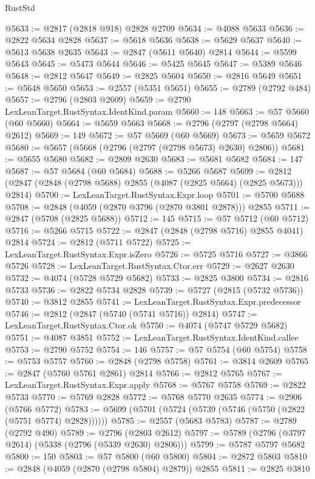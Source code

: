 \begin{lexlean}{RustStd}
\begin{coremodule}
@5633 := @2817 (@2818 @918) @2828 @2709
@5634 := @4088 @5633
@5636 := @2822 @5634 @2828
@5637 := @5618 @5636
@5638 := @5629 @5637
@5640 := @5613 @5638 @2635
@5643 := @2847 (@5611 @5640) @2814
@5644 := @5599 @5643
@5645 := @5473 @5644
@5646 := @5425 @5645
@5647 := @5389 @5646
@5648 := @2812 @5647
@5649 := @2825 @5604
@5650 := @2816 @5649
@5651 := @5648 @5650
@5653 := @2557 (@5351 @5651)
@5655 := @2789 (@2792 @484)
@5657 := @2796 (@2803 @2609)
@5659 := @2790 LexLeanTarget.RustSyntax.IdentKind.param
@5660 := 148
@5663 := @57 @5660 (@60 @5660)
@5664 := @5659 @5663
@5668 := @2796 (@2797 (@2798 @5664) @2612)
@5669 := 149
@5672 := @57 @5669 (@60 @5669)
@5673 := @5659 @5672
@5680 := @5657 (@5668 (@2796 (@2797 (@2798 @5673) @2630) @2806))
@5681 := @5655 @5680
@5682 := @2809 @2630
@5683 := @5681 @5682
@5684 := 147
@5687 := @57 @5684 (@60 @5684)
@5688 := @5266 @5687
@5699 := @2812 (@2847 (@2848 (@2798 @5688) @2855 (@4087 (@2825 @5664) (@2825 @5673))) @2814)
@5700 := LexLeanTarget.RustSyntax.Expr.loop
@5701 := @5700 @5688
@5708 := @2848 (@4059 (@2870 @3796 (@2870 @3801 @2878))) @2855
@5711 := @2847 (@5708 (@2825 @5688))
@5712 := 145
@5715 := @57 @5712 (@60 @5712)
@5716 := @5266 @5715
@5722 := @2847 (@2848 (@2798 @5716) @2855 @4041) @2814
@5724 := @2812 (@5711 @5722)
@5725 := LexLeanTarget.RustSyntax.Expr.isZero
@5726 := @5725 @5716
@5727 := @3866 @5726
@5728 := LexLeanTarget.RustSyntax.Ctor.err
@5729 := @2627 @2630
@5732 := @4074 (@5728 @5729 @5682)
@5733 := @2825 @3800
@5734 := @2816 @5733
@5736 := @2822 @5734 @2828
@5739 := @5727 (@2815 (@5732 @5736))
@5740 := @3812 @2855
@5741 := LexLeanTarget.RustSyntax.Expr.predecessor
@5746 := @2812 (@2847 (@5740 (@5741 @5716)) @2814)
@5747 := LexLeanTarget.RustSyntax.Ctor.ok
@5750 := @4074 (@5747 @5729 @5682)
@5751 := @4087 @3851
@5752 := LexLeanTarget.RustSyntax.IdentKind.callee
@5753 := @2790 @5752
@5754 := 146
@5757 := @57 @5754 (@60 @5754)
@5758 := @5753 @5757
@5760 := @2848 (@2798 @5758)
@5761 := @3814 @2609
@5765 := @2847 (@5760 @5761 @2861) @2814
@5766 := @2812 @5765
@5767 := LexLeanTarget.RustSyntax.Expr.apply
@5768 := @5767 @5758
@5769 := @2822 @5733
@5770 := @5769 @2828
@5772 := @5768 @5770 @2635
@5774 := @2906 (@5766 @5772)
@5783 := @5699 (@5701 (@5724 (@5739 (@5746 (@5750 (@2822 (@5751 @5774) @2828))))))
@5785 := @2557 (@5683 @5783)
@5787 := @2789 (@2792 @490)
@5789 := @2796 (@2803 @2612)
@5797 := @5789 (@2796 (@3797 @2614) (@5338 (@2796 (@5339 @2630) @2806)))
@5799 := @5787 @5797 @5682
@5800 := 150
@5803 := @57 @5800 (@60 @5800)
@5804 := @2872 @5803
@5810 := @2848 (@4059 (@2870 (@2798 @5804) @2879)) @2855
@5811 := @2825 @3810

\end{coremodule}
\end{lexlean}
